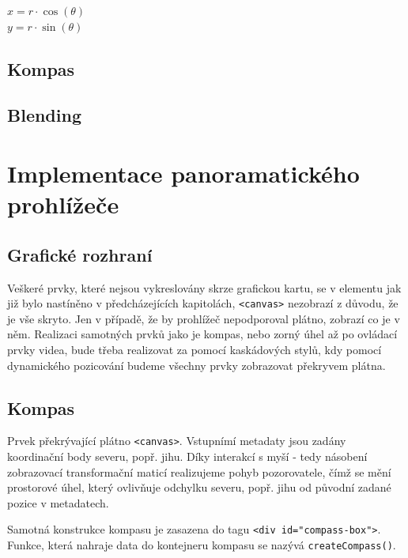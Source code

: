 \begin{description}
	\item [{\LARGE $ x = r\cdot\cos(\theta) $}] 
	\item [{\LARGE $ y = r\cdot\sin(\theta) $}]
\end{description}
 


\newpage


\section{Kompas}

\section{Blending}

\chapter{Implementace panoramatického prohlížeče}
\label{chapter:4}


\section{Grafické rozhraní}
Veškeré prvky, které nejsou vykreslovány skrze grafickou kartu, se v elementu jak již bylo nastíněno v předcházejících kapitolách, \texttt{<canvas>} nezobrazí z důvodu, že je vše skryto. Jen v případě, že by prohlížeč nepodporoval plátno, zobrazí co je v něm. Realizaci samotných prvků jako je kompas, nebo zorný úhel až po ovládací prvky videa, bude třeba realizovat za pomocí kaskádových stylů, kdy pomocí dynamického pozicování budeme všechny prvky zobrazovat překryvem plátna.

\section{Kompas}
Prvek překrývající plátno \texttt{<canvas>}. Vstupnímí metadaty jsou zadány koordinační body severu, popř. jihu. Díky interakcí s myší - tedy násobení zobrazovací transformační maticí realizujeme pohyb pozorovatele, čímž se mění prostorové úhel, který ovlivňuje odchylku severu, popř. jihu od původní zadané pozice v metadatech.

Samotná konstrukce kompasu je zasazena do tagu \texttt{<div id="compass-box">}. Funkce, která nahraje data do kontejneru kompasu se nazývá \texttt{createCompass()}.

